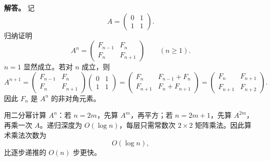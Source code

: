 ﻿\documentclass[UTF8,12pt]{ctexart}
\begin{document}
\begin{enumerate}[label=\textbf{\arabic*.},leftmargin=2.2em]
\textbf{解答。} 记
\[
A=\begin{pmatrix}0&1\\1&1\end{pmatrix}.
\]
归纳证明
\[
A^n=
\begin{pmatrix}
F_{n-1}&F_n\\
F_n&F_{n+1}
\end{pmatrix}
\qquad(n\ge1).
\]
\(n=1\) 显然成立。若对 \(n\) 成立，则
\[
A^{n+1}=
\begin{pmatrix}
F_{n-1}&F_n\\
F_n&F_{n+1}
\end{pmatrix}
\begin{pmatrix}0&1\\1&1\end{pmatrix}
=
\begin{pmatrix}
F_n&F_{n-1}+F_n\\
F_{n+1}&F_n+F_{n+1}
\end{pmatrix}
=
\begin{pmatrix}
F_n&F_{n+1}\\
F_{n+1}&F_{n+2}
\end{pmatrix}.
\]
因此 \(F_n\) 是 \(A^n\) 的非对角元素。

用二分幂计算 \(A^n\)：若 \(n=2m\)，先算 \(A^m\)，再平方；若 \(n=2m+1\)，先算 \(A^{2m}\)，再乘一次 \(A\)。递归深度为 \(O(\log n)\)，每层只需常数次 \(2\times2\) 矩阵乘法。因此算术乘法次数为
\[
O(\log n),
\]
比逐步递推的 \(O(n)\) 步更快。
\end{enumerate}
\end{document}
